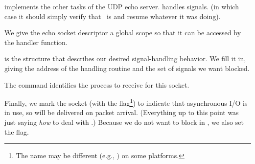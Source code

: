 \begin{topcode}



 implements the other tasks of the UDP echo server.
 handles  signals.
(in which case it should simply verify that \ is
 and resume whatever it was doing).


We give the echo socket descriptor a global scope so that it can be
accessed by the  handler function.


 is the  structure that
describes
our desired signal-handling behavior.  We fill it in, giving the
address of the handling routine and the set of
signals we want blocked.

\begin{bottomcode}





The  command identifies the
process to receive  for this socket.


Finally, we mark the socket (with the  flag\footnote{The
name
may be different (e.g., ) on some platforms.})
to indicate that asynchronous I/O is in use,
so  will be delivered on packet arrival.
(Everything up to this point was just saying \emph{how}
to deal with .)
Because we do not want
 to block in ,
we also set the  flag.
\end{bottomcode}


\end{topcode}

